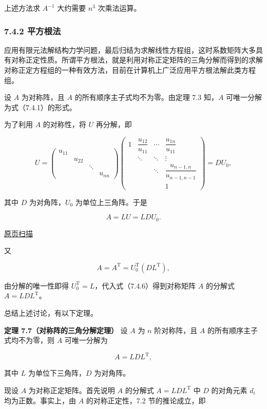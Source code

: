 \documentclass[
  10pt,
  fontset=fandol]{ctexart}
\begin{document}
上述方法求 \(A^{-1}\) 大约需要 \(n^3\) 次乘法运算。

\subsubsection{7.4.2 平方根法}\label{ux5e73ux65b9ux6839ux6cd5}

应用有限元法解结构力学问题，最后归结为求解线性方程组，这时系数矩阵大多具有对称正定性质。所谓平方根法，就是利用对称正定矩阵的三角分解而得到的求解对称正定方程组的一种有效方法，目前在计算机上广泛应用平方根法解此类方程组。

设 \(A\) 为对称阵，且 \(A\) 的所有顺序主子式均不为零。由定理 7.3 知，\(A\) 可唯一分解为式（7.4.1）的形式。

为了利用 \(A\) 的对称性，将 \(U\) 再分解，即

\[
U=\begin{pmatrix}
u_{11}&&&\\
&u_{22}&&\\
&&\ddots&\\
&&&u_{nn}
\end{pmatrix}
\begin{pmatrix}
1&\dfrac{u_{12}}{u_{11}}&\cdots&\dfrac{u_{1n}}{u_{11}}\\
&\ddots&\ddots&\vdots\\
&&\ddots&\dfrac{u_{n-1,n}}{u_{n-1,n-1}}\\
&&&1
\end{pmatrix}=DU_0,
\]

其中 \(D\) 为对角阵，\(U_0\) 为单位上三角阵。于是

\[A=LU=LDU_0.\tag{7.4.6}\]

\href{../../source-images/pdf-195.jpeg}{原页扫描}

又

\[A=A^{\mathrm T}=U_0^{\mathrm T}(DL^{\mathrm T}),\]

由分解的唯一性即得 \(U_0^{\mathrm T}=L\)，代入式（7.4.6）得到对称矩阵 \(A\) 的分解式 \(A=LDL^{\mathrm T}\)。

总结上述讨论，有以下定理。

\textbf{定理 7.7（对称阵的三角分解定理）} 设 \(A\) 为 \(n\) 阶对称阵，且 \(A\) 的所有顺序主子式均不为零，则 \(A\) 可唯一分解为

\[A=LDL^{\mathrm T},\]

其中 \(L\) 为单位下三角阵，\(D\) 为对角阵。

现设 \(A\) 为对称正定矩阵。首先说明 \(A\) 的分解式 \(A=LDL^{\mathrm T}\) 中 \(D\) 的对角元素 \(d_i\) 均为正数。事实上，由 \(A\) 的对称正定性，7.2 节的推论成立，即
\end{document}
